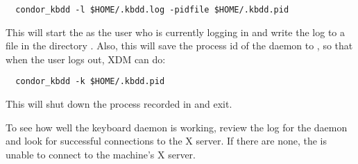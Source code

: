 \footnotesize
\begin{verbatim}
  condor_kbdd -l $HOME/.kbdd.log -pidfile $HOME/.kbdd.pid
\end{verbatim}
\normalsize

This will start the  as the user who is currently logging in
and write the log to a file in the directory 
.  Also, this
will save the process id of the daemon to , so that when the user
logs out, XDM can do:

\footnotesize
\begin{verbatim}
  condor_kbdd -k $HOME/.kbdd.pid
\end{verbatim}
\normalsize

This will shut down the process recorded in  and exit.

To see how well the keyboard daemon is working, review
the log for the daemon and look for successful connections to the X
server.  If there are none, the 
is unable to connect to the machine's X server.

